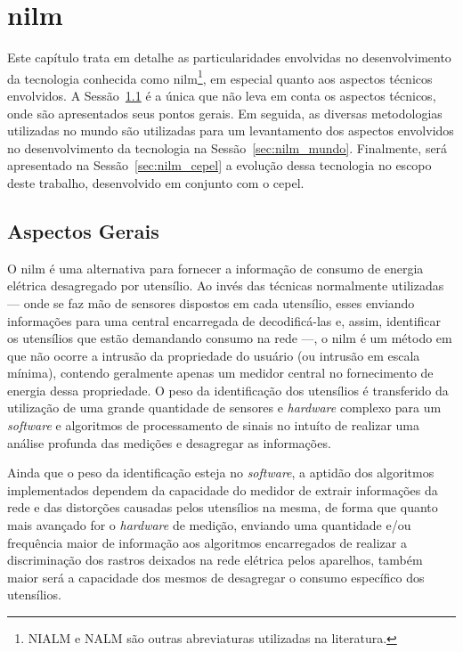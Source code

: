 \chapter[Monitoramento Não-Invasivo de Cargas Elétricas]{\acrfull{nilm}}
\label{cap:nilm}

Este capítulo trata em detalhe as particularidades envolvidas no
desenvolvimento da tecnologia conhecida como
\gls{nilm}\footnote{NIALM e NALM são outras abreviaturas utilizadas na
literatura.}, em especial quanto aos aspectos técnicos envolvidos. A
Sessão~\ref{sec:nilm_aspec_gerais} é a única que não leva em conta os
aspectos técnicos, onde são apresentados seus pontos gerais. Em
seguida, as diversas metodologias utilizadas no mundo são utilizadas
para um levantamento dos aspectos envolvidos no desenvolvimento da
tecnologia na Sessão~\ref{sec:nilm_mundo}. Finalmente, será
apresentado na Sessão~\ref{sec:nilm_cepel} a evolução dessa tecnologia
no escopo deste trabalho, desenvolvido em conjunto com o \gls{cepel}.

\section{Aspectos Gerais}
\label{sec:nilm_aspec_gerais}

O \gls{nilm} é uma alternativa para fornecer a informação de consumo
de energia elétrica desagregado por utensílio. Ao invés das técnicas
normalmente utilizadas --- onde se faz mão de sensores dispostos em cada
utensílio, esses enviando informações para uma central encarregada de
decodificá-las e, assim, identificar os utensílios que estão demandando
consumo na rede ---, o \gls{nilm} é um método em que não ocorre a intrusão
da propriedade do usuário (ou intrusão em escala mínima), contendo
geralmente apenas um medidor central no fornecimento de energia dessa
propriedade. O peso da identificação dos utensílios é transferido da
utilização de uma grande quantidade de sensores e \emph{hardware}
complexo para um \emph{software} e algoritmos de processamento de
sinais no intuíto de realizar uma análise profunda das medições e
desagregar as informações.

Ainda que o peso da identificação esteja no \emph{software}, a
aptidão dos algoritmos implementados dependem da capacidade do
medidor de extrair informações da rede e das distorções causadas pelos
utensílios na mesma, de forma que quanto mais avançado for o
\emph{hardware} de medição, enviando uma quantidade e/ou frequência
maior de informação aos algoritmos encarregados de realizar a
discriminação dos rastros deixados na rede elétrica pelos aparelhos,
também maior será a capacidade dos mesmos de desagregar o consumo
específico dos utensílios.


